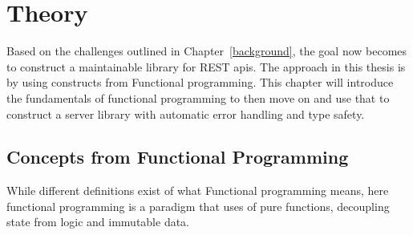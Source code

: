 \chapter{Theory}\label{theory} 

Based on the challenges outlined in Chapter~\ref{background}, the goal now
becomes to construct a maintainable library for REST apis. The approach in this
thesis is by using constructs from Functional programming. This chapter will
introduce the fundamentals of functional programming to then move on and use
that to construct a server library with automatic error handling and type
safety.

\section{Concepts from Functional Programming}\label{functionalprogramming}

 While different definitions exist of what Functional programming means, here 
 functional programming is a paradigm that uses of pure functions,
 decoupling state from logic and immutable data.

